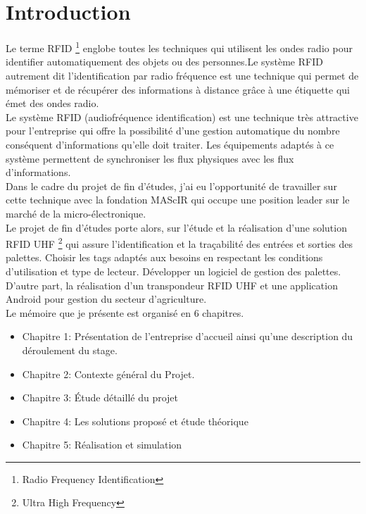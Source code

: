 \documentclass[11pt, a4paper, twoside]{book}
\begin{document}
\listoffigures

\listoftables

\chapter*{Introduction}
Le terme RFID \footnote{Radio Frequency Identification} englobe toutes les techniques qui utilisent les ondes radio pour identifier automatiquement des objets ou des personnes.Le système RFID autrement dit l'identification par radio fréquence est une technique qui permet de mémoriser et de récupérer des informations à distance grâce à une étiquette qui émet des ondes radio.\\

Le système RFID (audiofréquence identification) est une technique très attractive pour l'entreprise qui offre la possibilité d'une gestion automatique du nombre conséquent d'informations qu'elle doit traiter. Les équipements adaptés à ce système permettent de synchroniser les flux physiques avec les flux d'informations.\\

Dans le cadre du projet de fin d'études, j'ai eu l'opportunité de travailler sur cette technique avec la fondation MAScIR qui occupe une position leader sur le marché de la micro-électronique.\\

Le projet de fin d’études porte alors, sur l'étude et la réalisation d’une solution RFID UHF \footnote{Ultra High Frequency} qui assure l’identification et la traçabilité des entrées et sorties des palettes. Choisir les tags adaptés aux besoins en respectant les conditions d’utilisation et type de lecteur. Développer un logiciel de gestion des palettes. D’autre part, la réalisation d’un transpondeur RFID UHF et une application Android pour gestion du secteur d'agriculture.\\


Le mémoire que je présente est organisé en 6 chapitres.

\begin{itemize}
\item Chapitre 1: Présentation de l'entreprise d'accueil ainsi qu'une description du déroulement du stage.
\item Chapitre 2: Contexte général du Projet.
\item Chapitre 3: Étude détaillé du projet 
\item Chapitre 4: Les solutions proposé et étude théorique
\item Chapitre 5: Réalisation et simulation
\end{itemize}
\end{document}
